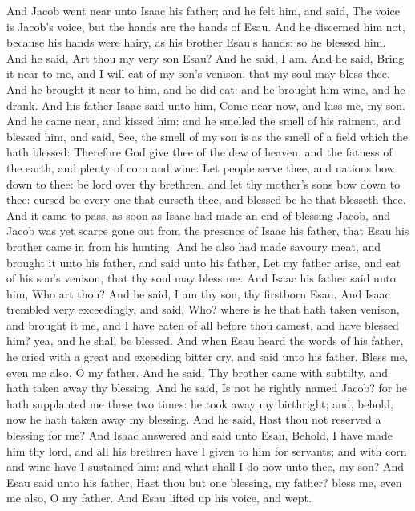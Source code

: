 \begin{biblechapter}
\verse And Jacob went near unto Isaac his father; and he felt him, and said, The voice is Jacob's voice, but the hands are the hands of Esau.
\verse And he discerned him not, because his hands were hairy, as his brother Esau's hands: so he blessed him.
\verse And he said, Art thou my very son Esau? And he said, I am.
\verse And he said, Bring it near to me, and I will eat of my son's venison, that my soul may bless thee. And he brought it near to him, and he did eat: and he brought him wine, and he drank.
\verse And his father Isaac said unto him, Come near now, and kiss me, my son.
\verse And he came near, and kissed him: and he smelled the smell of his raiment, and blessed him, and said, See, the smell of my son is as the smell of a field which the \LORD hath blessed:
\verse Therefore God give thee of the dew of heaven, and the fatness of the earth, and plenty of corn and wine:
\verse Let people serve thee, and nations bow down to thee: be lord over thy brethren, and let thy mother's sons bow down to thee: cursed be every one that curseth thee, and blessed be he that blesseth thee.
\verse And it came to pass, as soon as Isaac had made an end of blessing Jacob, and Jacob was yet scarce gone out from the presence of Isaac his father, that Esau his brother came in from his hunting.
\verse And he also had made savoury meat, and brought it unto his father, and said unto his father, Let my father arise, and eat of his son's venison, that thy soul may bless me.
\verse And Isaac his father said unto him, Who art thou? And he said, I am thy son, thy firstborn Esau.
\verse And Isaac trembled very exceedingly, and said, Who? where is he that hath taken venison, and brought it me, and I have eaten of all before thou camest, and have blessed him? yea, and he shall be blessed.
\verse And when Esau heard the words of his father, he cried with a great and exceeding bitter cry, and said unto his father, Bless me, even me also, O my father.
\verse And he said, Thy brother came with subtilty, and hath taken away thy blessing.
\verse And he said, Is not he rightly named Jacob? for he hath supplanted me these two times: he took away my birthright; and, behold, now he hath taken away my blessing. And he said, Hast thou not reserved a blessing for me?
\verse And Isaac answered and said unto Esau, Behold, I have made him thy lord, and all his brethren have I given to him for servants; and with corn and wine have I sustained him: and what shall I do now unto thee, my son?
\verse And Esau said unto his father, Hast thou but one blessing, my father? bless me, even me also, O my father. And Esau lifted up his voice, and wept.

\end{biblechapter}
